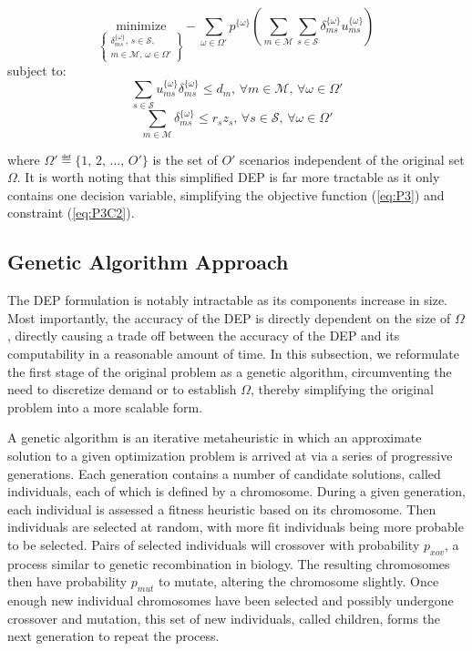 \documentclass[onecolumn,draftcls]{IEEEtran}
\begin{document}
\begin{equation} \label{eq:P3}
\underset{\left\{ \substack{
	\delta_{ms}^{\{\omega\}},\,	s \in \mathcal{S},\\
	m \in \mathcal{M},\, \omega \in \Omega'} \right\}} {\text{minimize}}
- \sum_{\omega \in \Omega'} p^{\{\omega\}} \left( \sum_{m \in \mathcal{M}} \sum_{s \in \mathcal{S}} \delta_{ms}^{\{\omega\}} u_{ms}^{\{\omega\}} \right)
\end{equation}
subject to:
\begin{equation} \label{eq:P3C1}
\sum_{s \in \mathcal{S}} u_{ms}^{\{\omega\}} \delta_{ms}^{\{\omega\}} \leq d_m,\, \forall m \in \mathcal{M},\, \forall \omega \in \Omega'
\end{equation}
\begin{equation} \label{eq:P3C2}
\sum_{m \in \mathcal{M}} \delta_{ms}^{\{\omega\}} \leq r_s z_s,\, \forall s \in \mathcal{S},\, \forall \omega \in \Omega'
\end{equation}
\fi

\noindent where $\Omega' \eqdef \{1,\, 2,\, \ldots,\, O'\}$ is the set of $O'$ scenarios independent of the original set $\Omega$.  It is worth noting that this simplified DEP is far more tractable as it only contains one decision variable, simplifying the objective function (\ref{eq:P3}) and constraint (\ref{eq:P3C2}).

\subsection{Genetic Algorithm Approach} \label{ga}
The DEP formulation is notably intractable as its components increase in size.  Most importantly, the accuracy of the DEP is directly dependent on the size of $\Omega$, directly causing a trade off between the accuracy of the DEP and its computability in a reasonable amount of time.  In this subsection, we reformulate the first stage of the original problem as a genetic algorithm, circumventing the need to discretize demand or to establish $\Omega$, thereby simplifying the original problem into a more scalable form.

A genetic algorithm is an iterative metaheuristic in which an approximate solution to a given optimization problem is arrived at via a series of progressive generations.  Each generation contains a number of candidate solutions, called individuals, each of which is defined by a chromosome.  During a given generation, each individual is assessed a fitness heuristic based on its chromosome.  Then individuals are selected at random, with more fit individuals being more probable to be selected.  Pairs of selected individuals will crossover with probability $p_{xov}$, a process similar to genetic recombination in biology.  The resulting chromosomes then have probability $p_{mut}$ to mutate, altering the chromosome slightly.  Once enough new individual chromosomes have been selected and possibly undergone crossover and mutation, this set of new individuals, called children, forms the next generation to repeat the process.  %
\end{document}
